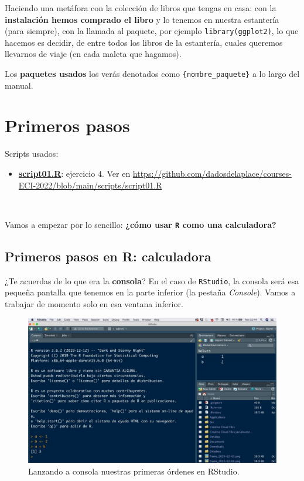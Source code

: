\documentclass[11pt,]{book}
\providecommand{\tightlist}{%
  \setlength{\itemsep}{0pt}\setlength{\parskip}{0pt}}
\begin{document}
Haciendo una metáfora con la colección de libros que tengas en casa: con la \textbf{instalación hemos comprado el libro} y lo tenemos en nuestra estantería (para siempre), con la llamada al paquete, por ejemplo \texttt{library(ggplot2)}, lo que hacemos es decidir, de entre todos los libros de la estantería, cuales queremos llevarnos de viaje (en cada maleta que hagamos).

Los \textbf{paquetes usados} los verás denotados como \texttt{\{nombre\_paquete\}} a lo largo del manual.

\hypertarget{primeros-pasos}{%
\chapter{Primeros pasos}\label{primeros-pasos}}

\begin{blackbox}

Scripts usados:

\begin{itemize}
\tightlist
\item
  \href{https://github.com/dadosdelaplace/courses-ECI-2022/blob/main/scripts/script01.R}{\textbf{script01.R}}: ejercicio 4. Ver en \url{https://github.com/dadosdelaplace/courses-ECI-2022/blob/main/scripts/script01.R}
\end{itemize}


\end{blackbox}

~

Vamos a empezar por lo sencillo: \textbf{¿cómo usar \texttt{R} como una calculadora?}

\hypertarget{primeros-pasos-en-r-calculadora}{%
\section{Primeros pasos en R: calculadora}\label{primeros-pasos-en-r-calculadora}}

¿Te acuerdas de lo que era la \textbf{consola}? En el caso de \texttt{RStudio}, la consola será esa pequeña pantalla que tenemos en la parte inferior (la pestaña \emph{Console}). Vamos a trabajar de momento solo en esa ventana inferior.

\begin{figure}

{\centering \includegraphics[width=0.75\linewidth]{./img/inicio_rstudio_2} 

}

\caption{Lanzando a consola nuestras primeras órdenes en RStudio.}\label{fig:inicio-rstudio-2a}
\end{figure}
\end{document}
